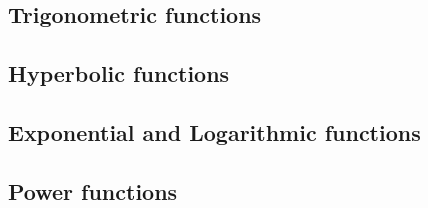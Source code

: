 \subsection{Trigonometric functions}
\label{section:fpm:math-complex:trig}

\subsection{Hyperbolic functions}
\label{section:fpm:math-complex:hyperbolic}

\subsection{Exponential and Logarithmic functions}
\label{section:fpm:math-complex:explog}

\subsection{Power functions}
\label{section:fpm:math-complex:power}


